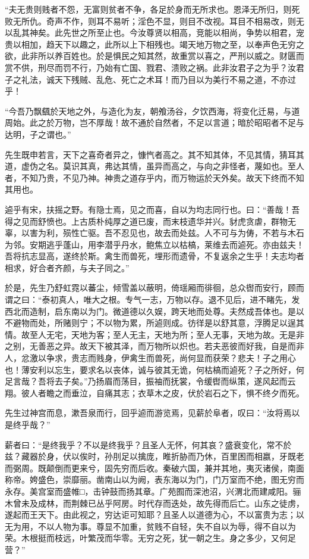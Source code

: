 \documentclass[UTF8,titlepage,oneside]{ctexbook}
\begin{document}
“夫无贵则贱者不怨，无富则贫者不争，各足於身而无所求也。恩泽无所归，则死败无所仇。奇声不作，则耳不易听；淫色不显，则目不改视。耳目不相易改，则无以乱其神矣。此先世之所至止也。今汝尊贤以相高，竞能以相尚，争势以相君，宠贵以相加，趋天下以趣之，此所以上下相残也。竭天地万物之至，以奉声色无穷之欲，此非所以养百姓也。於是惧民之知其然，故重赏以喜之，严刑以威之。财匮而赏不供，刑尽而罚不行，乃始有亡国、戮君、溃败之祸。此非汝君子之为乎？汝君子之礼法，诚天下残贼、乱危、死亡之术耳！而乃目以为美行不易之道，不亦过乎！


“今吾乃飘颻於天地之外，与造化为友，朝飧汤谷，夕饮西海，将变化迁易，与道周始。此之於万物，岂不厚哉！故不通於自然者，不足以言道；暗於昭昭者不足与达明，子之谓也。”


先生既申若言，天下之喜奇者异之，慷忾者高之。其不知其体，不见其情，猜耳其道，虚伪之名。莫识其真，弗达其情，虽异而高之，与向之非怪者，蔑如也。至人者，不知乃贵，不见乃神。神贵之道存乎内，而万物运於天外矣。故天下终而不知其用也。


逌乎有宋，扶摇之野。有隐士焉，见之而喜，自以为均志同行也。曰：“善哉！吾得之见而舒愤也。上古质朴纯厚之道已废，而末枝遗华并兴。豺虎贪虐，群物无辜，以害为利，殒性亡驱。吾不忍见也，故去而处兹。人不可与为俦，不若与木石为邻。安期逃乎蓬山，用李潜乎丹水，鲍焦立以枯槁，莱维去而逌死。亦由兹夫！吾将抗志显高，遂终於斯。禽生而兽死，埋形而遗骨，不复返余之生乎！夫志均者相求，好合者齐颜，与夫子同之。”


於是，先生乃舒虹霓以蕃尘，倾雪盖以蔽明，倚瑶厢而徘徊，总众辔而安行，顾而谓之曰：“泰初真人，唯大之根。专气一志，万物以存。退不见后，进不睹先，发西北而造制，启东南以为门。微道德以久娱，跨天地而处尊。夫然成吾体也。是以不避物而处，所赌则宁；不以物为累，所逌则成。彷徉是以舒其意，浮腾足以逞其情。故至人无宅，天地为客；至人无主，天地为所；至人无事，天地为故。无是非之别，无善恶之异。故天下被其泽，而万物所以炽也。若夫恶彼而好我，自是而非人，忿激以争求，贵志而贱身，伊禽生而兽死，尚何显而获荣？悲夫！子之用心也！薄安利以忘生，要求名以丧体，诚与彼其无诡，何枯槁而逌死？子之所好，何足言哉？吾将去子矣。”乃扬眉而荡目，振袖而抚裳，令缓辔而纵策，遂风起而云翔。彼人者瞻之而垂泣，自痛其志；衣草木之皮，伏於岩石之下，惧不终夕而死。


先生过神宫而息，漱吾泉而行，回乎逌而游览焉，见薪於阜者，叹曰：“汝将焉以是终乎哉？”


薪者曰：“是终我乎？不以是终我乎？且圣人无怀，何其哀？盛衰变化，常不於兹？藏器於身，伏以俟时，孙刖足以擒庞，睢折胁而乃休，百里困而相嬴，牙既老而弼周。既颠倒而更来兮，固先穷而后收。秦破六国，兼并其地，夷灭诸侯，南面称帝。姱盛色，崇靡丽。凿南山以为阙，表东海以为门，门万室而不绝，图无穷而永存。美宫室而盛帷□，击钟鼓而扬其章。广苑囿而深池沼，兴渭北而建咸阳。骊木曾未及成林，而荆棘已丛乎阿房。时代存而迭处，故先得而后亡。山东之徒虏，遂起而王天下。由此视之，穷达讵可知耶？且圣人以道德为心，不以富贵为志；以无为用，不以人物为事。尊显不加重，贫贱不自轻，失不自以为辱，得不自以为荣。木根挺而枝远，叶繁茂而华零。无穷之死，犹一朝之生。身之多少，又何足营？”
\end{document}
